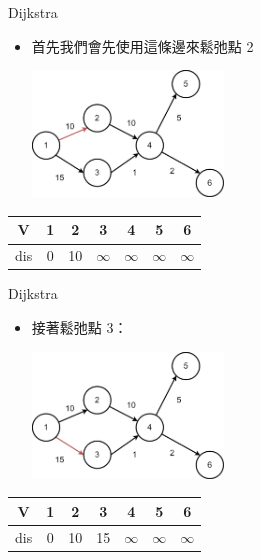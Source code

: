 \documentclass[aspectratio=169]{beamer}
\begin{document}
    \begin{frame}{Dijkstra}
        \begin{itemize}
            \item 首先我們會先使用這條邊來鬆弛點 2
            \begin{center}
                \includegraphics[width=0.4\textwidth]{src/dijkstra_2.png}
            \end{center}
        \end{itemize}

        \begin{center}
            \begin{tabular}{c|c|c|c|c|c|c}
                V & 1 & 2 & 3 & 4 & 5 & 6 \\
                \hline
                dis & 0 & 10 & $\infty$ & $\infty$ & $\infty$ & $\infty$
            \end{tabular}
        \end{center}
    \end{frame}

    \begin{frame}{Dijkstra}
        \begin{itemize}
            \item 接著鬆弛點 3：
            \begin{center}
                \includegraphics[width=0.4\textwidth]{src/dijkstra_3.png}
            \end{center}
        \end{itemize}

        \begin{center}
            \begin{tabular}{c|c|c|c|c|c|c}
                V & 1 & 2 & 3 & 4 & 5 & 6 \\
                \hline
                dis & 0 & 10 & 15 & $\infty$ & $\infty$ & $\infty$
            \end{tabular}
        \end{center}
    \end{frame}
\end{document}
